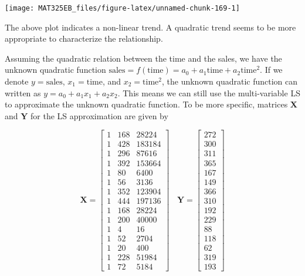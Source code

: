 \documentclass[
]{book}
\begin{document}
\begin{center}\texttt{[image: MAT325EB\_files/figure-latex/unnamed-chunk-169-1]} \end{center}

The above plot indicates a non-linear trend. A quadratic trend seems to be more appropriate to characterize the relationship.

Assuming the quadratic relation between the time and the sales, we have the unknown quadratic function \(\text{sales} = f(\text{time}) = a_0 + a_1 \text{time} + a_2\text{time}^2\). If we denote \(y = \text{sales}\), \(x_1 = \text{time}\), and \(x_2 = \text{time}^2\), the unknown quadratic function can written as \(y = a_0 + a_1x_1 +a_2x_2\). This means we can still use the multi-variable LS to approximate the unknown quadratic function. To be more specific, matrices \(\mathbf{X}\) and \(\mathbf{Y}\) for the LS approximation are given by

\[
\mathbf{X} = \left[
\begin{array}{ccc}
1  &  168  &  28224  \\
1  &  428  &  183184  \\
1  &  296  &  87616  \\
1  &  392  &  153664  \\
1  &  80  &  6400  \\
1  &  56  &  3136  \\
1  &  352  &  123904  \\
1  &  444  &  197136  \\
1  &  168  &  28224  \\
1  &  200  &  40000\\
1  &  4  &  16  \\
1  &  52  &  2704  \\
1  &  20  &  400  \\
1  &  228  &  51984  \\
1  &  72  &  5184
\end{array}
\right]
~~~~
\mathbf{Y} =\left[
\begin{array}{c}
272\\
300\\
311\\
365\\
167\\
149\\
366\\
310\\
192\\
229\\
88\\
118\\
62\\
319\\
193
\end{array}
\right]
\]
\end{document}
